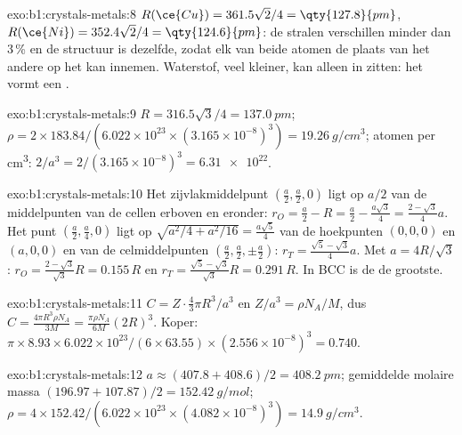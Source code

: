 \begin{solution}{exo:b1:crystals-metals:8}
$R(\ce{Cu}) = 361.5\sqrt2/4 = \qty{127.8}{pm}$, $R(\ce{Ni}) = 352.4\sqrt2/4
= \qty{124.6}{pm}$: de stralen verschillen minder dan 3\,\% en de
structuur is dezelfde, zodat elk van beide atomen de plaats van het
andere op het  kan innemen. Waterstof, veel kleiner, kan alleen
in  zitten: het vormt een .
\end{solution}

\begin{solution}{exo:b1:crystals-metals:9}
$R = 316.5\sqrt3/4 = \qty{137.0}{pm}$; $\rho = 2 \times 183.84/(6.022 \times
10^{23} \times (3.165 \times 10^{-8})^3) = \qty{19.26}{g/cm^3}$; atomen per
\unit{cm^3}: $2/a^3 = 2/(3.165 \times 10^{-8})^3 = \num{6.31e22}$.
\end{solution}

\begin{solution}{exo:b1:crystals-metals:10}
Het zijvlakmiddelpunt $(\frac a2,\frac a2,0)$ ligt op $a/2$ van de
middelpunten van de cellen erboven en eronder:
$r_O = \frac a2 - R = \frac a2 - \frac{a\sqrt3}{4}
= \frac{2-\sqrt3}{4}a$. Het punt $(\frac a2,\frac a4,0)$ ligt op
$\sqrt{a^2/4 + a^2/16} = \frac{a\sqrt5}{4}$ van de hoekpunten $(0,0,0)$ en
$(a,0,0)$ en van de celmiddelpunten $(\frac a2,\frac a2,\pm\frac a2)$:
$r_T = \frac{\sqrt5 - \sqrt3}{4}a$. Met $a = 4R/\sqrt3$:
$r_O = \frac{2-\sqrt3}{\sqrt3}R = 0.155\,R$ en
$r_T = \frac{\sqrt5-\sqrt3}{\sqrt3}R = 0.291\,R$. In BCC is de
 de grootste.
\end{solution}

\begin{solution}{exo:b1:crystals-metals:11}
$C = Z\cdot\frac43\pi R^3/a^3$ en $Z/a^3 = \rho N_A/M$, dus $C =
\frac{4\pi R^3\rho N_A}{3M} = \frac{\pi\rho N_A}{6M}(2R)^3$. Koper:
$\pi \times 8.93 \times 6.022 \times 10^{23}/(6 \times 63.55) \times (2.556
\times 10^{-8})^3 = 0.740$.
\end{solution}

\begin{solution}{exo:b1:crystals-metals:12}
$a \approx (407.8 + 408.6)/2 = \qty{408.2}{pm}$; gemiddelde molaire massa
$(196.97 +
107.87)/2 = \qty{152.42}{g/mol}$; $\rho = 4 \times 152.42/(6.022 \times
10^{23} \times (4.082 \times 10^{-8})^3) = \qty{14.9}{g/cm^3}$.
\end{solution}

